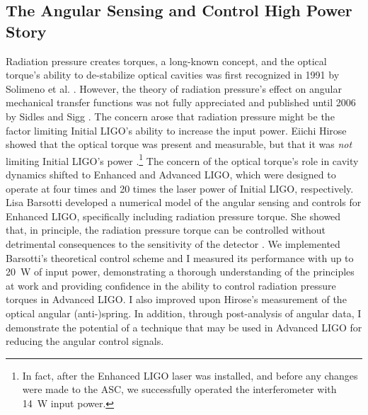 \subsection{The Angular Sensing and Control High Power Story}
Radiation pressure creates torques, a long-known concept, and the
optical torque's ability to de-stabilize optical cavities was first
recognized in 1991 by Solimeno et
al. \cite{Solimeno1991FabryPerot}. However, the theory of radiation
pressure's effect on angular mechanical transfer functions was not
fully appreciated and published until 2006 by Sidles and Sigg
\cite{Sidles2006Optical}. The concern arose that radiation pressure
might be the factor limiting Initial LIGO's ability to increase the
input power. Eiichi Hirose showed that the optical torque was present
and measurable, but that it was \emph{not} limiting Initial LIGO's
power \cite{Hirose2010Angular}.\footnote{In fact, after the Enhanced
  LIGO laser was installed, and before any changes were made to the
  ASC, we successfully operated the interferometer with 14~W input
  power.} %
The concern of the optical torque's role in cavity dynamics shifted to
Enhanced and Advanced LIGO, which were designed to operate at four
times and 20 times the laser power of Initial LIGO, respectively. Lisa
Barsotti developed a numerical model of the angular sensing and
controls for Enhanced LIGO, specifically including radiation pressure
torque. She showed that, in principle, the radiation pressure torque
can be controlled without detrimental consequences to the sensitivity
of the detector \cite{Barsotti2009Modeling}. We implemented Barsotti's
theoretical control scheme and I measured its performance with up to
20~W of input power, demonstrating a thorough understanding of the
principles at work and providing confidence in the ability to control
radiation pressure torques in Advanced LIGO. I also improved upon
Hirose's measurement of the optical angular (anti-)spring. In
addition, through post-analysis of angular data, I demonstrate the
potential of a technique that may be used in Advanced LIGO for
reducing the angular control signals.



